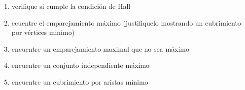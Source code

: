\documentclass[10pt,a4paper]{article} %
\begin{document}
            \begin{enumerate}
                \item {verifique si cumple la condición de Hall}
                \item {ecuentre el emparejamiento máximo (justifiquelo
                    mostrando un cubrimiento por vértices minimo)}
                \item {encuentre un emparejamiento maximal que no sea máximo}
                \item {encuentre un conjunto independiente máximo }
                \item {encuentre un cubrimiento por aristas mínimo}
            \end{enumerate}








    \nocite{*}
    
    
\end{document}
